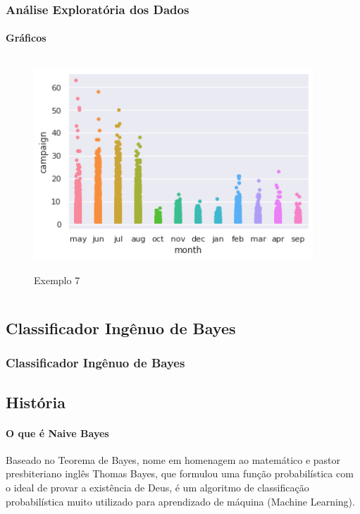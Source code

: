 \documentclass{beamer}
\begin{document}
\begin{frame}
    \frametitle{Análise Exploratória dos Dados}
    \framesubtitle{Gráficos}
    
    
    \begin{columns}
        \begin{column}{0.5\textwidth}
            \begin{figure}[h]
                \caption{Exemplo 7}
                \centering %
                \includegraphics[width=1\textwidth]{IMGS/img7.png}
                \label{figura:distidade}
            \end{figure}
        \end{column}
        \begin{column}{0.5\textwidth}

        \end{column}
        \end{columns} 
          
\end{frame}

\begin{frame}
    \section{Classificador Ingênuo de Bayes}
    \frametitle{Classificador Ingênuo de Bayes}
    \subsection{História}
    \framesubtitle{O que é Naive Bayes}
    
    Baseado no Teorema de Bayes, nome em homenagem ao matemático e pastor presbiteriano inglês Thomas Bayes, que formulou uma função probabilística com o ideal de provar a existência de Deus, é um algoritmo de classificação probabilística muito utilizado para aprendizado de máquina (Machine Learning).
    
\end{frame}
\end{document}
